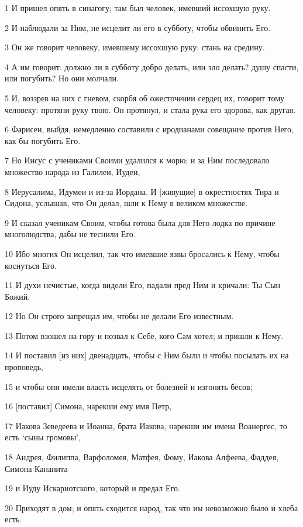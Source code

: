 \par 1 И пришел опять в синагогу; там был человек, имевший иссохшую руку.
\par 2 И наблюдали за Ним, не исцелит ли его в субботу, чтобы обвинить Его.
\par 3 Он же говорит человеку, имевшему иссохшую руку: стань на средину.
\par 4 А им говорит: должно ли в субботу добро делать, или зло делать? душу спасти, или погубить? Но они молчали.
\par 5 И, воззрев на них с гневом, скорбя об ожесточении сердец их, говорит тому человеку: протяни руку твою. Он протянул, и стала рука его здорова, как другая.
\par 6 Фарисеи, выйдя, немедленно составили с иродианами совещание против Него, как бы погубить Его.
\par 7 Но Иисус с учениками Своими удалился к морю; и за Ним последовало множество народа из Галилеи, Иудеи,
\par 8 Иерусалима, Идумеи и из-за Иордана. И [живущие] в окрестностях Тира и Сидона, услышав, что Он делал, шли к Нему в великом множестве.
\par 9 И сказал ученикам Своим, чтобы готова была для Него лодка по причине многолюдства, дабы не теснили Его.
\par 10 Ибо многих Он исцелил, так что имевшие язвы бросались к Нему, чтобы коснуться Его.
\par 11 И духи нечистые, когда видели Его, падали пред Ним и кричали: Ты Сын Божий.
\par 12 Но Он строго запрещал им, чтобы не делали Его известным.
\par 13 Потом взошел на гору и позвал к Себе, кого Сам хотел; и пришли к Нему.
\par 14 И поставил [из них] двенадцать, чтобы с Ним были и чтобы посылать их на проповедь,
\par 15 и чтобы они имели власть исцелять от болезней и изгонять бесов;
\par 16 [поставил] Симона, нарекши ему имя Петр,
\par 17 Иакова Зеведеева и Иоанна, брата Иакова, нарекши им имена Воанергес, то есть `сыны громовы',
\par 18 Андрея, Филиппа, Варфоломея, Матфея, Фому, Иакова Алфеева, Фаддея, Симона Кананита
\par 19 и Иуду Искариотского, который и предал Его.
\par 20 Приходят в дом; и опять сходится народ, так что им невозможно было и хлеба есть.
